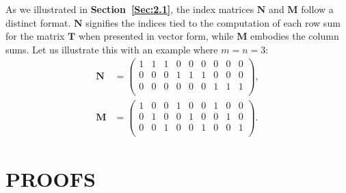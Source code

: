 \documentclass[11pt]{article}
\newcommand{\mat}[1]{\mathbf{#1}}
\begin{document}
As we illustrated in {\bf Section~\ref{Sec:2.1}}, the index matrices $\mat{N}$ and $\mat{M}$ follow a distinct format. $\mat{N}$ signifies the indices tied to the computation of each row sum for the matrix $\mat{T}$ when presented in vector form, while $\mat{M}$ embodies the column sums. Let us illustrate this with an example where $m=n=3$:\begin{equation*}
\begin{split}
\mat{N}&=\begin{pmatrix}
1&1&1& 0& 0& 0& 0& 0&0\\
0 & 0& 0&1&1&1& 0& 0&0\\
0 & 0& 0& 0& 0& 0&1&1&1\\
\end{pmatrix},\\
\mat{M}&=\begin{pmatrix}
1& 0& 0&1& 0& 0&1& 0&0\\
0&1& 0& 0&1& 0& 0&1&0\\
0& 0&1& 0& 0&1& 0& 0&1\\
\end{pmatrix}.
\end{split}
\end{equation*}

\section{PROOFS}
\end{document}
